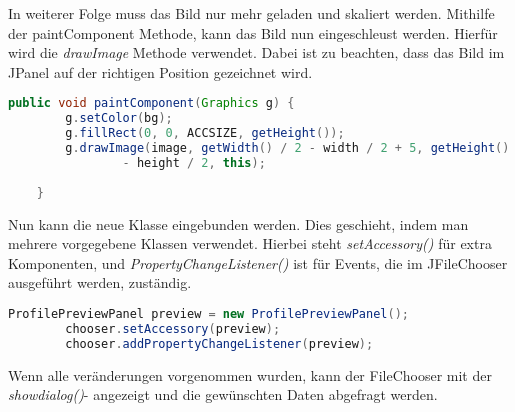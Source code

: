 In weiterer Folge muss das Bild nur mehr geladen und skaliert werden. Mithilfe der paintComponent Methode, kann das Bild nun eingeschleust werden. Hierfür wird die \textit{drawImage} Methode verwendet. Dabei ist zu beachten, dass das Bild im JPanel auf der richtigen Position gezeichnet wird.
\begin{lstlisting}[language=JAVA]
public void paintComponent(Graphics g) {
		g.setColor(bg);
		g.fillRect(0, 0, ACCSIZE, getHeight());
		g.drawImage(image, getWidth() / 2 - width / 2 + 5, getHeight() / 2
				- height / 2, this);
		
	}
\end{lstlisting}

Nun kann die neue Klasse eingebunden werden. Dies geschieht, indem man mehrere vorgegebene Klassen verwendet. Hierbei steht \textit{setAccessory()} für extra Komponenten, und \textit{PropertyChangeListener()} ist für Events, die im JFileChooser ausgeführt werden, zuständig.

\begin{lstlisting}[language=JAVA]
		ProfilePreviewPanel preview = new ProfilePreviewPanel();
		chooser.setAccessory(preview);
		chooser.addPropertyChangeListener(preview);
\end{lstlisting}

Wenn alle veränderungen vorgenommen wurden, kann der FileChooser mit der \textit{showdialog()}- angezeigt und die gewünschten Daten abgefragt werden.